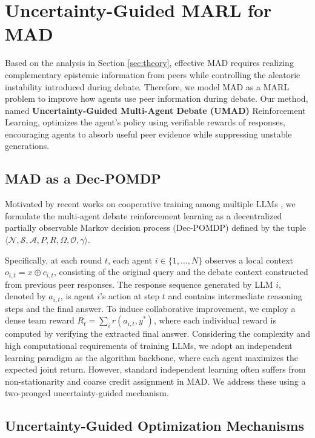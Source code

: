 \documentclass{article}
\theoremstyle{plain}
\theoremstyle{definition}
\theoremstyle{remark}
\begin{document}
   

\section{Uncertainty-Guided MARL for MAD}
\label{sec:method}

Based on the analysis in Section \ref{sec:theory}, effective MAD requires realizing complementary epistemic information from peers while controlling the aleatoric instability introduced during debate. Therefore, we model MAD as a MARL problem to improve how agents use peer information during debate. Our method, named \textbf{Uncertainty-Guided Multi-Agent Debate (UMAD)} Reinforcement Learning, optimizes the agent's policy using verifiable rewards of responses, encouraging agents to absorb useful peer evidence while suppressing unstable generations.


\subsection{MAD as a Dec-POMDP} \label{subsec:MAD_POMDP}

Motivated by recent works on cooperative training among multiple LLMs \cite{park2025maporl,liao2025marft, wan2025rema}, we formulate the multi-agent debate reinforcement learning as a decentralized partially observable Markov decision process (Dec-POMDP) \cite{oliehoek2016concise} defined by the tuple $\langle \mathcal{N}, \mathcal{S}, \mathcal{A}, P, R, \Omega, \mathcal{O}, \gamma \rangle$. 

Specifically, at each round $t$, each agent $i \in \{1, \dots, N\}$ observes a local context $o_{i,t}=x\oplus c_{i,t}$, consisting of the original query and the debate context constructed from previous peer responses. The response sequence generated by LLM $i$, denoted by $a_{i,t}$, is agent $i$'s action at step $t$ and contains intermediate reasoning steps and the final answer. To induce collaborative improvement, we employ a dense team reward $R_t = \sum_i r(a_{i,t}, y^*)$, where each individual reward is computed by verifying the extracted final answer. Considering the complexity and high computational requirements of training LLMs, we adopt an independent learning paradigm as the algorithm backbone, where each agent maximizes the expected joint return. However, standard independent learning often suffers from non-stationarity and coarse credit assignment in MAD. We address these using a two-pronged uncertainty-guided mechanism.


\subsection{Uncertainty-Guided Optimization Mechanisms} \label{sec:mechanisms}
\end{document}
